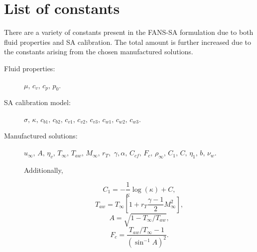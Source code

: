 \section{List of constants}

There are a variety of constants present in the FANS-SA formulation due to both fluid properties and SA calibration. The total amount is further increased due to the constants arising from the chosen manufactured solutions.

\begin{description}
	\item[Fluid properties:] $\mu, \,c_v, \, c_p,\,p_0$.

\item[SA calibration model:] $\sigma, \, \kappa, \, c_{b1}, \, c_{b2}, \, c_{v1}, \, c_{v2}, \, c_{v3}, \, c_{w1}, \, c_{w2}, \, c_{w3}$.

\item[Manufactured solutions:] $u_\infty, \, A, \, \eta_v, \, T_\infty, \, T_{aw},\, M_\infty, \, r_T,$  $\gamma, %
\alpha, \, C_{cf}, \, F_c, \, \rho_\infty, \, C_1, \, C,\, \eta_1, \, b, \, \nu_w$.

Additionally, 


$$C_1=-\dfrac{1}{\kappa} \log(\kappa)+C,$$%
$$T_{aw} =  T_{\infty} \left[ 1 + r_T \frac{\gamma - 1}{2} M_{\infty}^2 \right],$$
$$A = \sqrt{1 - T_{\infty}/T_{aw}},$$
$$ F_c = \frac{T_{aw}/T_{\infty} - 1}{ \left( \sin^{-1} A \right)^2} .$$
\end{description}

